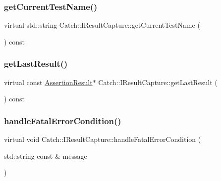 \hypertarget{struct_catch_1_1_i_result_capture_aea1617f4a84cc648246aa3ed6918b5bf}{}\label{struct_catch_1_1_i_result_capture_aea1617f4a84cc648246aa3ed6918b5bf} 
\subsubsection{\texorpdfstring{get\+Current\+Test\+Name()}{getCurrentTestName()}}
{\footnotesize\ttfamily virtual std\+::string Catch\+::\+I\+Result\+Capture\+::get\+Current\+Test\+Name (\begin{DoxyParamCaption}{ }\end{DoxyParamCaption}) const\hspace{0.3cm}{\ttfamily [pure virtual]}}

\hypertarget{struct_catch_1_1_i_result_capture_ab18872c89fab97405a56e9c6a4919736}{}\label{struct_catch_1_1_i_result_capture_ab18872c89fab97405a56e9c6a4919736} 
\subsubsection{\texorpdfstring{get\+Last\+Result()}{getLastResult()}}
{\footnotesize\ttfamily virtual const \hyperlink{class_catch_1_1_assertion_result}{Assertion\+Result}$\ast$ Catch\+::\+I\+Result\+Capture\+::get\+Last\+Result (\begin{DoxyParamCaption}{ }\end{DoxyParamCaption}) const\hspace{0.3cm}{\ttfamily [pure virtual]}}

\hypertarget{struct_catch_1_1_i_result_capture_a7d995222301e6605f26549726b30c3ee}{}\label{struct_catch_1_1_i_result_capture_a7d995222301e6605f26549726b30c3ee} 
\subsubsection{\texorpdfstring{handle\+Fatal\+Error\+Condition()}{handleFatalErrorCondition()}}
{\footnotesize\ttfamily virtual void Catch\+::\+I\+Result\+Capture\+::handle\+Fatal\+Error\+Condition (\begin{DoxyParamCaption}\item[{std\+::string const \&}]{message }\end{DoxyParamCaption})\hspace{0.3cm}{\ttfamily [pure virtual]}}

